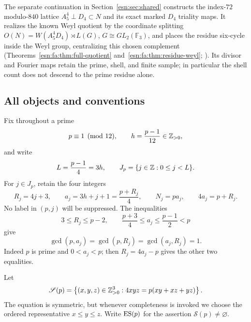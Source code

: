 The separate continuation in Section~\ref{esn:sec:shared} constructs
the index-$72$ modulo-$840$ lattice $A_5^4\perp D_4\subset N$ and
its exact marked $D_4$ triality maps. It realizes the known Weyl quotient
by the coordinate splitting $O(N)=W(A_5^4D_4)\rtimes L(G)$,
$G\cong GL_2(\mathbb F_3)$, and places the residue six-cycle inside
the Weyl group, centralizing this chosen complement
(Theorems~\ref{esn:fa:thm:full-quotient}
and~\ref{esn:fa:thm:residue-weyl}; \cite[Table~3]{esn:CDH2014}).
Its divisor and Fourier maps retain the prime, shell, and finite sample;
in particular the shell count does not descend to the prime residue alone.

\subsection{All objects and conventions}

Fix throughout a prime
\[
 p\equiv1\pmod {12},\qquad
 h=\frac{p-1}{12}\in\mathbb Z_{>0},
\]
and write
\[
 L=\frac{p-1}{4}=3h,
 \qquad J_p=\{j\in\mathbb Z:0\leq j<L\}.
\]
For \(j\in J_p\), retain the four integers
\begin{equation}
 R_j=4j+3,
 \qquad a_j=3h+j+1=\frac{p+R_j}{4},
 \qquad N_j=pa_j,
 \qquad 4a_j=p+R_j.                         \tag{1.1}
\end{equation}
No label in \((p,j)\) will be suppressed.  The inequalities
\[
 3\leq R_j\leq p-2,
 \qquad \frac{p+3}{4}\leq a_j\leq\frac{p-1}{2}<p
\]
give
\begin{equation}
 \gcd(p,a_j)=\gcd(p,R_j)=\gcd(a_j,R_j)=1.  \tag{1.2}
\end{equation}
Indeed \(p\) is prime and \(0<a_j<p\); then \(R_j=4a_j-p\)
gives the other two equalities.

Let
\[
 \mathscr S(p)=
 \left\{(x,y,z)\in\mathbb Z_{>0}^3:
 4xyz=p(xy+xz+yz)\right\}.
\]
The equation is symmetric, but whenever completeness is invoked we choose the
ordered representative \(x\leq y\leq z\).
Write \(\operatorname{ES}(p)\) for the assertion \(\mathscr S(p)\neq\varnothing\).

